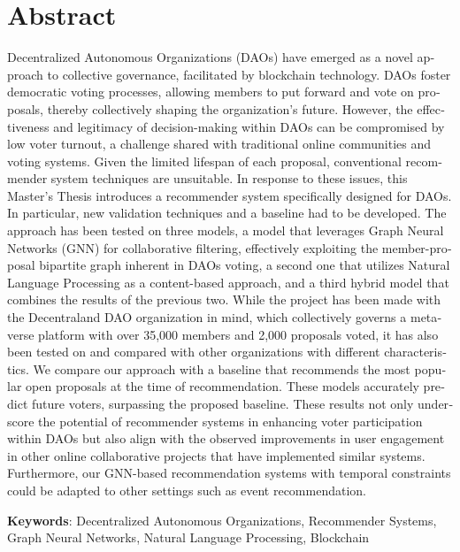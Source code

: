 \newpage

\chapter*{Abstract}
\begin{otherlanguage}{english}
Decentralized Autonomous Organizations (DAOs) have emerged as a novel approach to collective governance, facilitated by blockchain technology. DAOs foster democratic voting processes, allowing members to put forward and vote on proposals, thereby collectively shaping the organization’s future. However, the effectiveness and legitimacy of decision-making within DAOs can be compromised by low voter turnout, a challenge shared with traditional online communities and voting systems. Given the limited lifespan of each proposal, conventional recommender system techniques are unsuitable. In response to these issues, this Master's Thesis introduces a recommender system specifically designed for DAOs. In particular, new validation techniques and a baseline had to be developed. The approach has been tested on three models, a model that leverages Graph Neural Networks (GNN) for collaborative filtering, effectively exploiting the member-proposal bipartite graph inherent in DAOs voting, a second one that utilizes Natural Language Processing as a content-based approach, and a third hybrid model that combines the results of the previous two. While the project has been made with the Decentraland DAO organization in mind, which collectively governs a metaverse platform with over 35,000 members and 2,000 proposals voted, it has also been tested on and compared with other organizations with different characteristics. We compare our approach with a baseline that recommends the most popular open proposals at the time of recommendation. These models accurately predict future voters, surpassing the proposed baseline. These results not only underscore the potential of recommender systems in enhancing voter participation within DAOs but also align with the observed improvements in user engagement in other online collaborative projects that have implemented similar systems. Furthermore, our GNN-based recommendation systems with temporal constraints could be adapted to other settings such as event recommendation.

\textbf{Keywords}: Decentralized Autonomous Organizations, Recommender Systems, Graph Neural Networks, Natural Language Processing, Blockchain
\end{otherlanguage}


